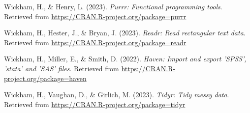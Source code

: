 \documentclass[
  man]{apa6}
\newlength{\cslhangindent}
\newlength{\cslentryspacingunit} %
\newenvironment{CSLReferences}[2] %
 {%
  \setlength{\parindent}{0pt}
  \ifodd #1
  \let\oldpar\par
  \def\par{\hangindent=\cslhangindent\oldpar}
  \fi
  \setlength{\parskip}{#2\cslentryspacingunit}
 }%
 {}
\begin{document}
\begin{CSLReferences}{1}{0}
\leavevmode{}%
Wickham, H., \& Henry, L. (2023). \emph{Purrr: Functional programming tools}. Retrieved from \url{https://CRAN.R-project.org/package=purrr}

\leavevmode{}%
Wickham, H., Hester, J., \& Bryan, J. (2023). \emph{Readr: Read rectangular text data}. Retrieved from \url{https://CRAN.R-project.org/package=readr}

\leavevmode{}%
Wickham, H., Miller, E., \& Smith, D. (2022). \emph{Haven: Import and export 'SPSS', 'stata' and 'SAS' files}. Retrieved from \url{https://CRAN.R-project.org/package=haven}

\leavevmode{}%
Wickham, H., Vaughan, D., \& Girlich, M. (2023). \emph{Tidyr: Tidy messy data}. Retrieved from \url{https://CRAN.R-project.org/package=tidyr}

\end{CSLReferences}
\end{document}
